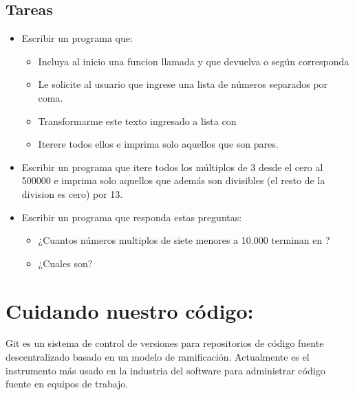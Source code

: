 \documentclass[a4paper,12pt,spanish]{sphinxmanual}
\begin{document}
\section{Tareas}
\label{\detokenize{for:tareas}}\begin{itemize}
\item {} 
\sphinxAtStartPar
Escribir un programa que:
\begin{itemize}
\item {} 
\sphinxAtStartPar
Incluya al inicio una funcion llamada  y que devuelva
 o  según corresponda

\item {} 
\sphinxAtStartPar
Le solicite al usuario que ingrese una lista de números separados por coma.

\item {} 
\sphinxAtStartPar
Transformarme este texto ingresado a lista con 

\item {} 
\sphinxAtStartPar
Iterere todos ellos e imprima solo aquellos que son pares.

\end{itemize}

\item {} 
\sphinxAtStartPar
Escribir un programa que itere todos los múltiplos de 3 desde el cero
al 500000 e imprima solo aquellos que además son divisibles (el resto
de la division es cero) por 13.

\item {} 
\sphinxAtStartPar
Escribir un programa que responda estas preguntas:
\begin{itemize}
\item {} 
\sphinxAtStartPar
¿Cuantos números multiplos de siete menores a 10.000 terminan en ?

\item {} 
\sphinxAtStartPar
¿Cuales son?

\end{itemize}

\end{itemize}

\sphinxstepscope


\chapter{Cuidando nuestro código: }
\label{\detokenize{git:cuidando-nuestro-codigo-git}}\label{\detokenize{git::doc}}
\sphinxAtStartPar
Git es un sistema de control de versiones para repositorios de código fuente
descentralizado basado en un modelo de ramificación.
Actualmente es el instrumento más usado en la industria del software para
administrar código fuente en equipos de trabajo.
\end{document}
